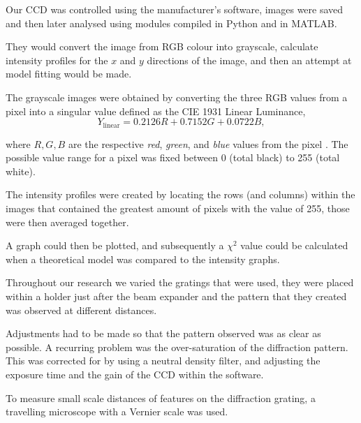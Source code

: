 \documentclass[twocolumn]{revtex4}
\begin{document}
Our CCD was controlled using the manufacturer's software, images were saved and then later analysed using modules compiled in Python and in MATLAB. 

They would convert the image from RGB colour into grayscale, calculate intensity profiles for the $x$ and $y$ directions of the image, and then an attempt at model fitting would be made.

The grayscale images were obtained by converting the three RGB values from a pixel into a singular value defined as the CIE 1931 Linear Luminance,
\begin{equation}
Y_{\text{linear}}=0.2126R+0.7152G+0.0722B,
\end{equation}

where $R,G,B$ are the respective \textit{red}, \textit{green}, and \textit{blue} values from the pixel \cite{rgbtogray}. The possible value range for a pixel was fixed between 0 (total black) to 255 (total white).

The intensity profiles were created by locating the rows (and columns) within the images that contained the greatest amount of pixels with the value of 255, those were then averaged together. 

A graph could then be plotted, and subsequently a $\chi^2$ value could be calculated when a theoretical model was compared to the intensity graphs.

Throughout our research we varied the gratings that were used, they were placed within a holder just after the beam expander and the pattern that they created was observed at different distances. 

Adjustments had to be made so that the pattern observed was as clear as possible. A recurring problem was the over-saturation of the diffraction pattern. This was corrected for by using a neutral density filter, and adjusting the exposure time and the gain of the CCD within the software.

To measure small scale distances of features on the diffraction grating, a travelling microscope with a Vernier scale was used.

\vspace{-3ex}
\end{document}

